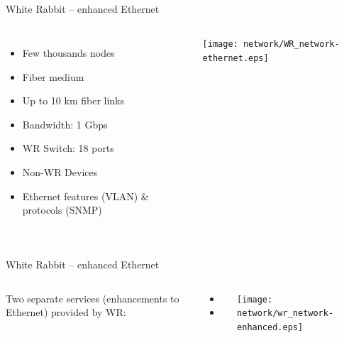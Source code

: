 \documentclass[compress,red]{beamer}
\begin{document}
\subsection{}
\begin{frame}{White Rabbit -- enhanced Ethernet}

\begin{columns}[c]
 

  \begin{itemize}
    \item Few thousands nodes
    \item Fiber medium
    \item Up to 10 km fiber links
    \item Bandwidth: 1 Gbps
    \item WR Switch: 18 ports
    \item Non-WR Devices
    \item Ethernet features (VLAN) \& protocols (SNMP)
  \end{itemize}

    \begin{center}
    \texttt{[image: network/WR\_network-ethernet.eps]}
    \end{center}
\end{columns}

\end{frame}
\subsection{}
\begin{frame}{White Rabbit -- enhanced Ethernet}


\begin{columns}[c]
 
  Two separate services (enhancements to Ethernet) provided by WR: 
  \begin{itemize}
    \item \color{blue!90}{High accuracy/precision synchronization}
    \item \color{red}{Deterministic, reliable and low-latency Control Data delivery}
  \end{itemize}

    \begin{center}
    \texttt{[image: network/wr\_network-enhanced.eps]}
    \end{center}
\end{columns}

\end{frame}
\end{document}
